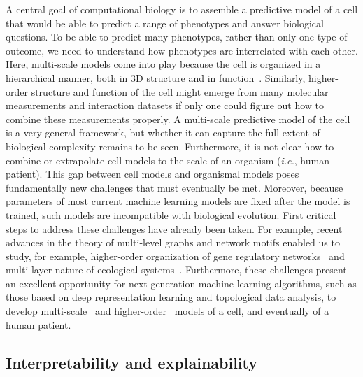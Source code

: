 \documentclass[5p]{elsarticle}
\newcommand{\ie}{\emph{i.e.}\xspace}
\newcommand{\rev}[1]{{\color{black}#1}}
\begin{document}
A central goal of computational biology is to assemble a predictive model of a cell that would be able to predict a range \rev{of phenotypes} and answer biological questions.
To be able to predict \rev{many phenotypes}, rather than only one type of outcome, we need to understand how phenotypes are interrelated with each other.
Here, multi-scale models come into play because the cell is organized in a hierarchical manner, both in 3D structure and in function~\cite{Carvunis2014siri}.
Similarly, \rev{higher-order} structure and function of the cell might emerge from many molecular measurements and interaction datasets if only one could figure out how to combine these measurements properly.
A multi-scale predictive model \rev{of the cell is} a very general framework, but whether it can capture the full extent of biological complexity remains to be seen.
Furthermore, it is not clear how to combine or extrapolate cell models to the scale of an organism (\ie, human patient).
This gap between \rev{cell models} and \rev{organismal models} poses fundamentally new challenges that must \rev{eventually be met}.
Moreover, because \rev{parameters of most current machine learning models are fixed} after the model is trained, such \rev{models are} incompatible with biological evolution.
First critical steps to address these challenges have already been taken.
For example, recent advances in the theory of multi-level graphs and network motifs enabled us to study, for example, higher-order organization of gene regulatory networks~\cite{Milenkovic2008uncovering,Benson2016higher} and multi-layer nature of ecological systems~\cite{Pilosof2017multilayer}.
Furthermore, these challenges present an excellent opportunity for next-generation machine learning algorithms, such as those based on deep representation learning and topological data analysis, to develop multi-scale~\cite{Zitnik2017ohmnet} and higher-order~\cite{Rizvi2017single} models of a cell, and eventually of a human patient.

\subsection{Interpretability and explainability}
\end{document}
